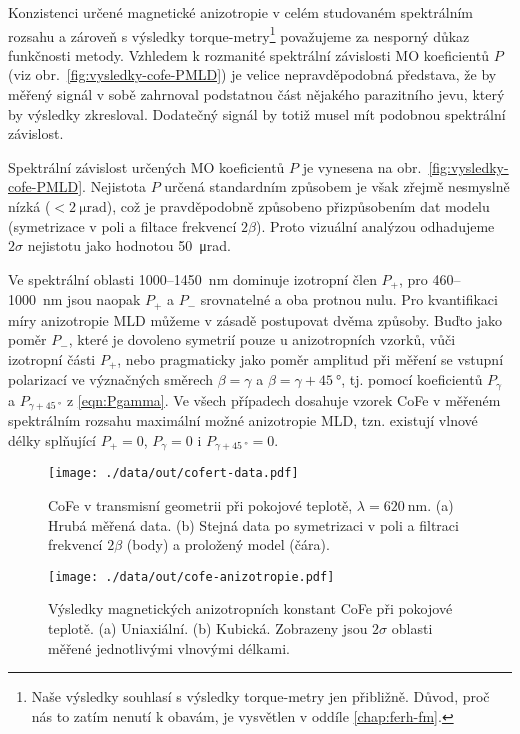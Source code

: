 Konzistenci určené magnetické anizotropie v celém studovaném spektrálním rozsahu a zároveň s výsledky torque-metry\footnote{Naše výsledky souhlasí s výsledky torque-metry jen přibližně. Důvod, proč nás to zatím nenutí k obavám, je vysvětlen v oddíle \ref{chap:ferh-fm}.} považujeme za nesporný důkaz funkčnosti metody.
Vzhledem k rozmanité spektrální závislosti MO koeficientů $P$ (viz obr.~\ref{fig:vysledky-cofe-PMLD}) je velice nepravděpodobná představa, že by měřený signál v sobě zahrnoval podstatnou část nějakého parazitního jevu, který by výsledky zkresloval.
Dodatečný signál by totiž musel mít podobnou spektrální závislost.

Spektrální závislost určených MO koeficientů $P$ je vynesena na obr.~\ref{fig:vysledky-cofe-PMLD}.
Nejistota $P$ určená standardním způsobem je však zřejmě nesmyslně nízká ($<\SI{2}{\micro\radian}$), což je pravděpodobně způsobeno přizpůsobením dat modelu (symetrizace v poli a filtace frekvencí $2\beta$).
Proto vizuální analýzou odhadujeme $2\sigma$ nejistotu jako hodnotou \SI{50}{\micro\radian}.

Ve spektrální oblasti \num{1000}--\SI{1450}{\nano\meter} dominuje izotropní člen $P_+$, pro \num{460}--\SI{1000}{\nano\meter} jsou naopak $P_+$ a $P_-$ srovnatelné a oba protnou nulu.
Pro kvantifikaci míry anizotropie MLD můžeme v zásadě postupovat dvěma způsoby.
Buďto jako poměr $P_-$, které je dovoleno symetrií pouze u anizotropních vzorků, vůči izotropní části $P_+$, nebo pragmaticky jako poměr amplitud při měření se vstupní polarizací ve význačných směrech $\beta=\gamma$ a $\beta=\gamma+\SI{45}{\degree}$, tj. pomocí koeficientů $P_\gamma$ a $P_{\gamma+\SI{45}{\degree}}$ z \eqref{eqn:Pgamma}.
Ve všech případech dosahuje vzorek CoFe v měřeném spektrálním rozsahu maximální možné anizotropie MLD, tzn. existují vlnové délky splňující $P_+=0$, $P_\gamma=0$ i $P_{\gamma+\SI{45}{\degree}}=0$.



\begin{figure}[htbp]
    \centering
    \texttt{[image: ./data/out/cofert-data.pdf]}
    \caption{CoFe v transmisní geometrii při pokojové teplotě, $\lambda=\SI{620}{\nano\meter}$. (a) Hrubá měřená data. (b) Stejná data po symetrizaci v poli a filtraci frekvencí $2\beta$ (body) a proložený model (čára).}
    \label{fig:vysledky-cofe-data}
\end{figure}

\begin{figure}[htbp]
    \centering
    \texttt{[image: ./data/out/cofe-anizotropie.pdf]}
    \caption{Výsledky magnetických anizotropních konstant CoFe při pokojové teplotě. (a) Uniaxiální. (b) Kubická. Zobrazeny jsou $2\sigma$ oblasti měřené jednotlivými vlnovými délkami.}
    \label{fig:vysledky-cofe-roomt-anizotropie}
\end{figure}

